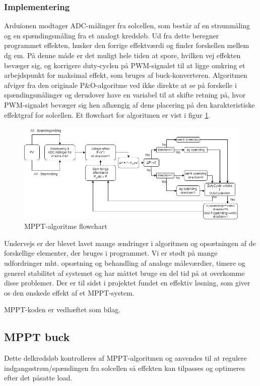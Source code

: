 \documentclass[../main.tex]{subfiles}
\begin{document}
    \subsubsection{Implementering}

    Arduionen modtager ADC-målinger fra solcellen, som består af en strømmåling og en spændingsmåling fra et analogt kredsløb. Ud fra dette beregner programmet effekten, husker den forrige effektværdi og finder forskellen mellem dg em. På denne måde er det muligt hele tiden at spore, hvilken vej effekten bevæger sig, og korrigere duty-cyclen på PWM-signalet til at ligge omkring et arbejdspunkt for maksimal effekt, som bruges af buck-konverteren. Algoritmen afviger fra den originale P&O-algoritme ved ikke direkte at se på forskelle i spændingsmålinger og derudover have en variabel til at skifte retning på, hvor PWM-signalet bevæger sig hen afhængig af dens placering på den karakteristiske effektgraf for solcellen. Et flowchart for algoritmen er vist i figur \ref{fig: MPPT Flowchart}.
        
    \begin{figure}[H]
      \includegraphics[width=\textwidth]{Dokumentation/mpptflowchart.drawio (1).png}
     \caption{MPPT-algoritme flowchart}
     \label{fig: MPPT Flowchart}
     \end{figure}
    
    Undervejs er der blevet lavet mange ændringer i algoritmen og opsætningen af de forskellige elementer, der bruges i programmet. Vi er stødt på mange udfordringer mht. opsætning og behandling af analoge måleværdier, timere og generel stabilitet af systemet og har måttet bruge en del tid på at overkomme disse problemer. Der er til sidst i projektet fundet en effektiv løsning, som giver os den ønskede effekt af et MPPT-system.

    MPPT-koden er vedhæftet som bilag.


    \subsection{MPPT buck}
        Dette delkredsløb kontrolleres af MPPT-algoritmen og anvendes til at regulere indgangsstrøm/spændingen fra solcellen så effekten kan tilpasses og optimeres efter det påsatte load.
        
\end{document}
